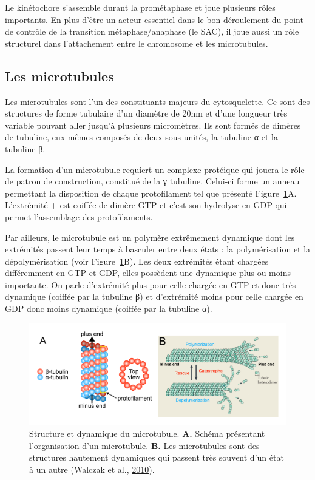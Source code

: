 \documentclass[12pt,a4paper,twoside,openright]{book}
\begin{document}
Le kinétochore s'assemble durant la prométaphase et joue plusieurs rôles
importants. En plus d'être un acteur essentiel dans le bon déroulement
du point de contrôle de la transition métaphase/anaphase (le SAC), il
joue aussi un rôle structurel dans l'attachement entre le chromosome et
les microtubules.

\subsection{Les microtubules}\label{les-microtubules}

Les microtubules sont l'un des constituants majeurs du cytosquelette. Ce
sont des structures de forme tubulaire d'un diamètre de 20nm et d'une
longueur très variable pouvant aller jusqu'à plusieurs micromètres. Ils
sont formés de dimères de tubuline, eux mêmes composés de deux sous
unités, la tubuline α et la tubuline β.

La formation d'un microtubule requiert un complexe protéique qui jouera
le rôle de patron de construction, constitué de la γ tubuline. Celui-ci
forme un anneau permettant la disposition de chaque protofilament tel
que présenté Figure~\ref{fig:mt}A. L'extrémité + est coiffée de dimère
GTP et c'est son hydrolyse en GDP qui permet l'assemblage des
protofilaments.

Par ailleurs, le microtubule est un polymère extrêmement dynamique dont
les extrémités passent leur temps à basculer entre deux états : la
polymérisation et la dépolymérisation (voir Figure~\ref{fig:mt}B). Les
deux extrémités étant chargées différemment en GTP et GDP, elles
possèdent une dynamique plus ou moins importante. On parle d'extrémité
plus pour celle chargée en GTP et donc très dynamique (coiffée par la
tubuline β) et d'extrémité moins pour celle chargée en GDP donc moins
dynamique (coiffée par la tubuline α).

\begin{figure}[htbp]
\centering
\includegraphics{figures/intro/mt.png}
\caption{\label{fig:mt}Structure et dynamique du microtubule.
\textbf{A.} Schéma présentant l'organisation d'un microtubule.
\textbf{B.} Les microtubules sont des structures hautement dynamiques
qui passent très souvent d'un état à un autre (Walczak et al.,
\protect\hyperlink{ref-Walczak2010}{2010}).}
\end{figure}
\end{document}
